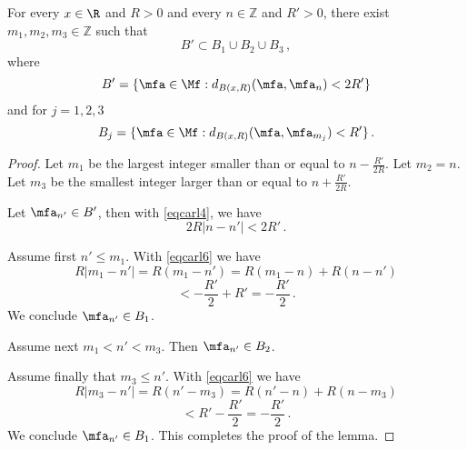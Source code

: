 \begin{lemma}
\label{integer-ball-cover}
    For every $x\in \R$ and $R>0$ and every
    $n\in \mathbb{Z}$ and $R'>0$,
    there exist $m_1, m_2, m_3\in \mathbb{Z}$
    such that
    \begin{equation}\label{eqcarl5}
        B'\subset B_1\cup B_2\cup B_3\, ,
    \end{equation}
where
\begin{equation}
B'= \{ \mfa \in \Mf: d_{B(x,R)}(\mfa, \mfa_n)<2R'\}
\end{equation}
and for $j=1,2,3$
\begin{equation}
  B_j=
     \{ \mfa \in \Mf: d_{B(x,R)}(\mfa, \mfa_{m_j})<R'\}
     \, .
\end{equation}

\end{lemma}
\begin{proof}
Let $m_1$ be the largest integer smaller than
or equal to
$n- \frac {R'} {2R}$.
Let $m_2=n$.
Let $m_3$ be the smallest integer larger than
or equal to $n+ \frac {R'} {2R}$.

Let $\mfa_{n'}\in B'$, then with \eqref{eqcarl4},
we have
\begin{equation}\label{eqcarl6}
    2R|n-n'|< 2R'\, .
\end{equation}

Assume first $n'\le m_1$. With \eqref{eqcarl6}
we have
\begin{equation*}
    R|m_1-n'|=R(m_1-n')=R(m_1-n)+R(n-n')
\end{equation*}
\begin{equation}
    < -\frac{R'}2+R'=-\frac{R'}2\, .
\end{equation}
We conclude $\mfa_{n'}\in B_1$.

Assume next $m_1<n'<m_3$. Then
$\mfa_{n'}\in B_2$.

Assume finally that $m_3\le n'$. With \eqref{eqcarl6}
we have
\begin{equation*}
    R|m_3-n'|=R(n'-m_3)=R(n'-n)+R(n-m_3)
\end{equation*}
\begin{equation}
    < R' -\frac{R'}2=-\frac{R'}2\, .
\end{equation}
We conclude $\mfa_{n'}\in B_1$.
This completes the proof of the lemma.
\end{proof}


